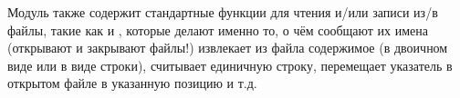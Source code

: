 Модуль также содержит стандартные функции для чтения и/или записи из/в файлы, такие как  и , которые делают именно то, о чём сообщают их имена (открывают и закрывают файлы!)
 извлекает из файла содержимое (в двоичном виде или в виде строки),  считывает единичную строку,  перемещает указатель в открытом файле в указанную позицию и т.д.
